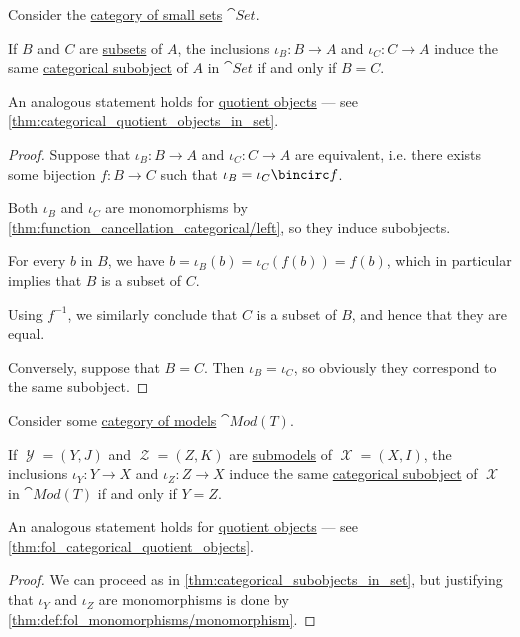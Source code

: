\begin{proposition}\label{thm:categorical_subobjects_in_set}
  Consider the \hyperref[def:category_of_small_sets]{category of small sets} \( \cat{Set} \).

  If \( B \) and \( C \) are \hyperref[def:subset]{subsets} of \( A \), the inclusions \( \iota_B: B \to A \) and \( \iota_C: C \to A \) induce the same \hyperref[def:categorical_subobject]{categorical subobject} of \( A \) in \( \cat{Set} \) if and only if \( B = C \).
\end{proposition}
\begin{comments}
  \item An analogous statement holds for \hyperref[def:categorical_quotient_object]{quotient objects} --- see \cref{thm:categorical_quotient_objects_in_set}.
\end{comments}
\begin{proof}
  \SufficiencySubProof Suppose that \( \iota_B: B \to A \) and \( \iota_C: C \to A \) are equivalent, i.e. there exists some bijection \( f: B \to C \) such that \( \iota_B = \iota_C \bincirc f \).

  Both \( \iota_B \) and \( \iota_C \) are monomorphisms by \cref{thm:function_cancellation_categorical/left}, so they induce subobjects.

  For every \( b \) in \( B \), we have \( b = \iota_B(b) = \iota_C(f(b)) = f(b) \), which in particular implies that \( B \) is a subset of \( C \).

  Using \( f^{-1} \), we similarly conclude that \( C \) is a subset of \( B \), and hence that they are equal.

  \NecessitySubProof Conversely, suppose that \( B = C \). Then \( \iota_B = \iota_C \), so obviously they correspond to the same subobject.
\end{proof}

\begin{proposition}\label{thm:fol_categorical_subobjects}
  Consider some \hyperref[def:fol_theory_model_functor/obj]{category of models} \( \cat{Mod}(T) \).

  If \( \mscrY = (Y, J) \) and \( \mscrZ = (Z, K) \) are \hyperref[def:fol_substructure/submodel]{submodels} of \( \mscrX = (X, I) \), the inclusions \( \iota_Y: Y \to X \) and \( \iota_Z: Z \to X \) induce the same \hyperref[def:categorical_subobject]{categorical subobject} of \( \mscrX \) in \( \cat{Mod}(T) \) if and only if \( Y = Z \).
\end{proposition}
\begin{comments}
  \item An analogous statement holds for \hyperref[def:categorical_quotient_object]{quotient objects} --- see \cref{thm:fol_categorical_quotient_objects}.
\end{comments}
\begin{proof}
  We can proceed as in \cref{thm:categorical_subobjects_in_set}, but justifying that \( \iota_Y \) and \( \iota_Z \) are monomorphisms is done by \cref{thm:def:fol_monomorphisms/monomorphism}.
\end{proof}

